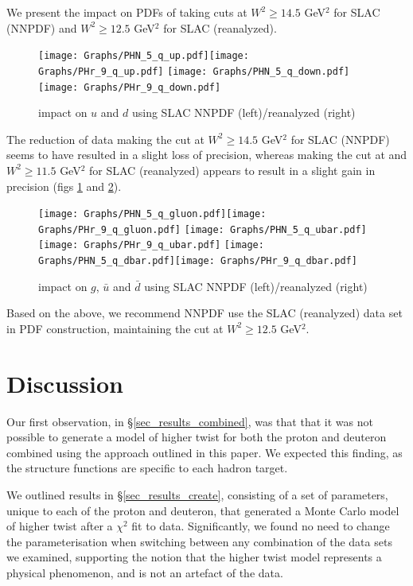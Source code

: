 \documentclass[12pt,a4paper]{report}
\begin{document}
We present the impact on PDFs of taking cuts at $W^2 \ge 14.5$ GeV$^2$ for SLAC (NNPDF) and $W^2 \ge 12.5$ GeV$^2$ for SLAC (reanalyzed).

\begin{figure}[H]
\begin{center}
\texttt{[image: Graphs/PHN\_5\_q\_up.pdf]}\texttt{[image: Graphs/PHr\_9\_q\_up.pdf]}
\texttt{[image: Graphs/PHN\_5\_q\_down.pdf]}\texttt{[image: Graphs/PHr\_9\_q\_down.pdf]}
\caption{impact on $u$ and $d$ using SLAC NNPDF (left)/reanalyzed (right)}
\label{fig:res_impact_NNPDF31_a}
\end{center}
\end{figure}

The reduction of data making the cut at $W^2 \ge 14.5$ GeV$^2$ for SLAC (NNPDF) seems to have resulted in a slight loss of precision, whereas making the cut at and $W^2 \ge 11.5$ GeV$^2$ for SLAC (reanalyzed) appears to result in a slight gain in precision (figs \ref{fig:res_impact_NNPDF31_a} and \ref{fig:res_impact_NNPDF31_b}).

\begin{figure}[H]
\begin{center}
\texttt{[image: Graphs/PHN\_5\_q\_gluon.pdf]}\texttt{[image: Graphs/PHr\_9\_q\_gluon.pdf]}
\texttt{[image: Graphs/PHN\_5\_q\_ubar.pdf]}\texttt{[image: Graphs/PHr\_9\_q\_ubar.pdf]}
\texttt{[image: Graphs/PHN\_5\_q\_dbar.pdf]}\texttt{[image: Graphs/PHr\_9\_q\_dbar.pdf]}
\caption{impact on $g$, $\bar{u}$ and $\bar{d}$ using SLAC NNPDF (left)/reanalyzed (right)}
\label{fig:res_impact_NNPDF31_b}
\end{center}
\end{figure}

Based on the above, we recommend NNPDF use the SLAC (reanalyzed) data set in PDF construction, maintaining the cut at $W^2 \ge 12.5$ GeV$^2$.
\newpage
\section{Discussion}

Our first observation, in \S \ref{sec_results_combined}, was that that it was not possible to generate a model of higher twist for both the proton and deuteron combined using the approach outlined in this paper. We expected this finding, as the structure functions are specific to each hadron target.

We outlined results in \S \ref{sec_results_create}, consisting of a set of parameters, unique to each of the proton and deuteron, that generated a Monte Carlo model of higher twist after a $\chi^2$ fit to data. Significantly, we found no need to change the parameterisation when switching between any combination of the data sets we examined, supporting the notion that the higher twist model represents a physical phenomenon, and is not an artefact of the data.
\end{document}
